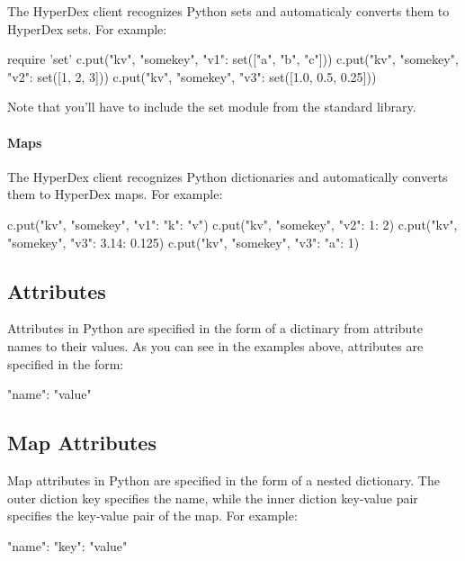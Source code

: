 The HyperDex client recognizes Python sets and automaticaly converts them to
HyperDex sets.  For example:

\begin{pythoncode}
require 'set'
c.put("kv", "somekey", {"v1": set(["a", "b", "c"])})
c.put("kv", "somekey", {"v2": set([1, 2, 3])})
c.put("kv", "somekey", {"v3": set([1.0, 0.5, 0.25])})
\end{pythoncode}

Note that you'll have to include the set module from the standard library.

\paragraph{Maps}

The HyperDex client recognizes Python dictionaries and automatically converts them to
HyperDex maps.  For example:

\begin{pythoncode}
c.put("kv", "somekey", {"v1": {"k": "v"}})
c.put("kv", "somekey", {"v2": {1: 2}})
c.put("kv", "somekey", {"v3": {3.14: 0.125}})
c.put("kv", "somekey", {"v3": {"a": 1}})
\end{pythoncode}

\subsection{Attributes}
\label{sec:api:python-client:attributes}

Attributes in Python are specified in the form of a dictinary from attribute names to
their values.  As you can see in the examples above, attributes are specified in
the form:

\begin{pythoncode}
{"name": "value"}
\end{pythoncode}

\subsection{Map Attributes}
\label{sec:api:python-client:map-attributes}

Map attributes in Python are specified in the form of a nested dictionary.  The outer
diction key specifies the name, while the inner diction key-value pair specifies the
key-value pair of the map.  For example:

\begin{pythoncode}
{"name": {"key": "value"}}
\end{pythoncode}

